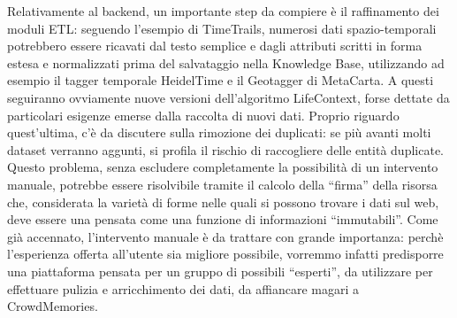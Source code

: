\documentclass[sigproc-sp.tex]{subfiles}
\begin{document}
Relativamente al backend, un importante step da compiere è il raffinamento dei moduli ETL: seguendo l’esempio di TimeTrails, numerosi dati spazio-temporali potrebbero essere ricavati dal testo semplice e dagli attributi scritti in forma estesa e normalizzati prima del salvataggio nella Knowledge Base, utilizzando ad esempio il tagger temporale HeidelTime e il Geotagger di MetaCarta. A questi seguiranno ovviamente nuove versioni dell’algoritmo LifeContext, forse dettate da particolari esigenze emerse dalla raccolta di nuovi dati. Proprio riguardo quest’ultima, c’è da discutere sulla rimozione dei duplicati: se più avanti molti dataset verranno aggunti, si profila il rischio di raccogliere delle entità duplicate. Questo problema, senza escludere completamente la possibilità di un intervento manuale, potrebbe essere risolvibile tramite il calcolo della “firma” della risorsa che, considerata la varietà di forme nelle quali si possono trovare i dati sul web, deve essere una pensata come una funzione di informazioni “immutabili”. Come già accennato, l’intervento manuale è da trattare con grande importanza: perchè l’esperienza offerta all’utente sia migliore possibile, vorremmo infatti predisporre una piattaforma pensata per un gruppo di possibili “esperti”, da utilizzare per effettuare pulizia e arricchimento dei dati, da affiancare magari a CrowdMemories.
\end{document}
